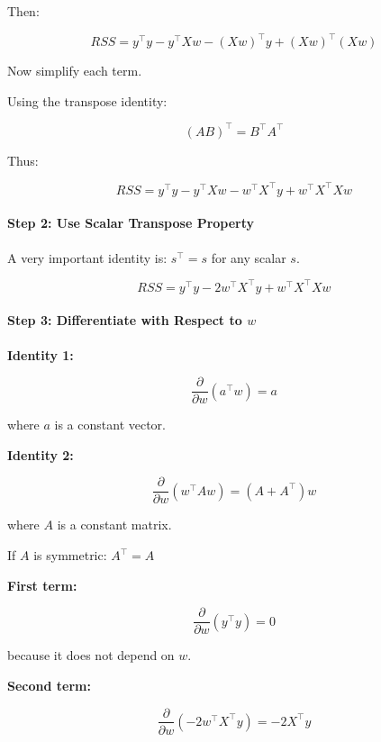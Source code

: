 \documentclass[10pt,a4paper]{article}
\begin{document}
	
	Then:
	
	\[
	RSS
	=
	y^\top y
	-
	y^\top Xw
	-
	(Xw)^\top y
	+
	(Xw)^\top(Xw)
	\]
	
	Now simplify each term.
	
	Using the transpose identity:
	
	\[
	(AB)^\top = B^\top A^\top
	\]
	
	Thus:
	
	\[
	RSS
	=
	y^\top y
	-
	y^\top Xw
	-
	w^\top X^\top y
	+
	w^\top X^\top X w
	\]
	
	\vspace{0.5em}
	
	\paragraph{Step 2: Use Scalar Transpose Property}
	A very important identity is: $s^\top = s$ for any scalar \(s\).

	\[
	RSS
	=
	y^\top y
	-
	2w^\top X^\top y
	+
	w^\top X^\top X w
	\]
	
	\vspace{0.5em}
	
	\paragraph{Step 3: Differentiate with Respect to \(w\)}

	\textbf{Identity 1:}
	
	\[
	\frac{\partial}{\partial w}(a^\top w)
	=
	a
	\]
	
	where \(a\) is a constant vector.
	
	\vspace{0.5em}
	
	\textbf{Identity 2:}
	
	\[
	\frac{\partial}{\partial w}(w^\top A w)
	=
	(A + A^\top)w
	\]
	
	where \(A\) is a constant matrix.
	
	If \(A\) is symmetric: $A^\top = A $
	
	
	\textbf{First term:}
	
	\[
	\frac{\partial}{\partial w}(y^\top y)=0
	\]
	
	because it does not depend on \(w\).
	
	\vspace{0.5em}
	
	\textbf{Second term:}
	
	\[
	\frac{\partial}{\partial w}
	(-2w^\top X^\top y)
	=
	-2X^\top y
	\]
	
\end{document}

